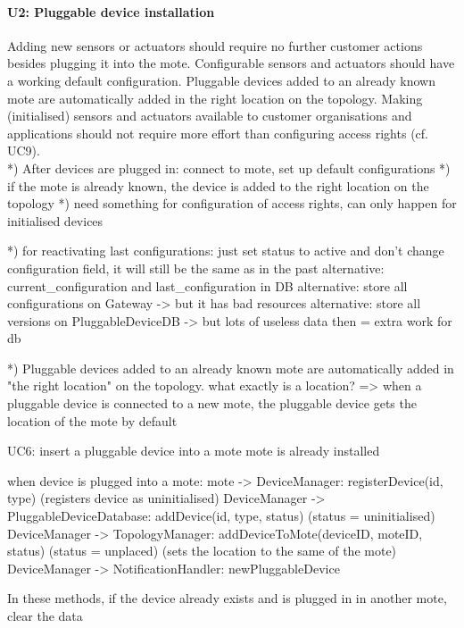     \paragraph{U2: Pluggable device installation}
        Adding new sensors or actuators should require no further customer
        actions besides plugging it into the mote. Configurable sensors and
        actuators should have a working default configuration.
        Pluggable devices added to an already known mote are automatically
        added in the right location on the topology.
        Making (initialised) sensors and actuators available to customer
        organisations and applications should not require more effort than
        configuring access rights (cf. UC9). \\
        *) After devices are plugged in: connect to mote, set up default configurations
        *) if the mote is already known, the device is added to the right location on the topology
        *) need something for configuration of access rights, can only happen for initialised devices

        *) for reactivating last configurations: just set status to active and don't change configuration field, it will still be the same as in the past
            alternative: current_configuration and last_configuration in DB
            alternative: store all configurations on Gateway -> but it has bad resources
            alternative: store all versions on PluggableDeviceDB -> but lots of useless data then = extra work for db

        *) Pluggable devices added to an already known mote are automatically added in "the right location" on the topology.
            what exactly is a location?
            => when a pluggable device is connected to a new mote, the pluggable device gets the location of the mote by default

        UC6: insert a pluggable device into a mote
            mote is already installed

            when device is plugged into a mote:
                mote -> DeviceManager: registerDevice(id, type) (registers device as uninitialised)
                DeviceManager -> PluggableDeviceDatabase: addDevice(id, type, status) (status = uninitialised)
                DeviceManager -> TopologyManager: addDeviceToMote(deviceID, moteID, status) (status = unplaced) (sets the location to the same of the mote)
                DeviceManager -> NotificationHandler: newPluggableDevice

                In these methods, if the device already exists and is plugged in in another mote, clear the data

